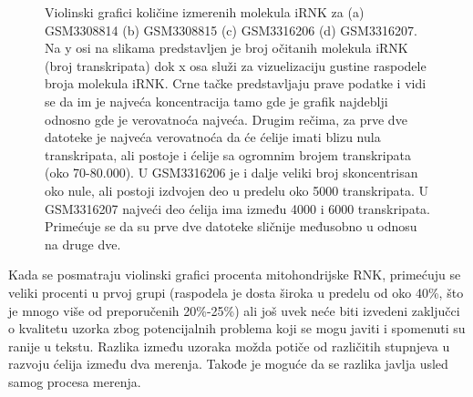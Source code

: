\documentclass{article}
\begin{document}
\begin{figure}[H]
    \centering
    \caption{ Violinski grafici količine izmerenih molekula iRNK za (a) GSM3308814 (b) GSM3308815 (c) GSM3316206 (d) GSM3316207. Na y osi na slikama predstavljen je broj očitanih molekula iRNK (broj transkripata) dok x osa služi za vizuelizaciju gustine raspodele broja molekula iRNK. Crne tačke predstavljaju prave podatke i vidi se da im je najveća koncentracija tamo gde je grafik najdeblji odnosno gde je verovatnoća najveća. Drugim rečima, za prve dve datoteke je najveća verovatnoća da će ćelije imati blizu nula transkripata, ali postoje i ćelije sa ogromnim brojem transkripata (oko 70-80.000). U GSM3316206 je i dalje veliki broj skoncentrisan oko nule, ali postoji izdvojen deo u predelu oko 5000 transkripata. U GSM3316207 najveći deo ćelija ima između 4000 i 6000 transkripata. Primećuje se da su prve dve datoteke sličnije međusobno u odnosu na druge dve. }
    \label{fig:n_counts_violin}
\end{figure}

Kada se posmatraju violinski grafici procenta mitohondrijske RNK, primećuju se veliki procenti u prvoj grupi (raspodela je dosta široka u predelu od oko 40\%, što je mnogo više od preporučenih 20\%-25\%\cite{sstutorial}) ali još uvek neće biti izvedeni zaključci o kvalitetu uzorka zbog potencijalnih problema koji se mogu javiti i spomenuti su ranije u tekstu. Razlika između uzoraka možda potiče od različitih stupnjeva u razvoju ćelija između dva merenja. Takođe je moguće da se razlika javlja usled samog procesa merenja. 
\end{document}
